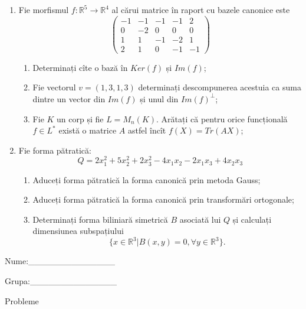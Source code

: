\documentclass{article}
\begin{document}
\begin{enumerate}
 \item Fie morfismul $f:\mathbb{R}^5 \to \mathbb{R}^4$ al cărui matrice în raport cu bazele canonice este
$$\begin{pmatrix}
-1&-1&-1&-1&2\\
0&-2&0&0&0\\
1&1&-1&-2&1\\
2&1&0&-1&-1
\end{pmatrix}$$

\begin{enumerate}
\item Determinați cîte o bază în $Ker(f)$ și $Im(f)$;
\item Fie vectorul $v=(1,3,1,3)$ determinați descompunerea acestuia ca suma dintre un vector din $Im(f)$ și unul din $Im(f)^\perp$;
\item Fie $K$ un corp și fie $L=M_n(K)$. Arătați că pentru orice funcțională $f \in L^*$ există o matrice $A$ astfel încît $f(X)=Tr(AX)$;
\end{enumerate}
\item Fie forma pătratică:
$$Q= 2x_1^2+5x_2^2+2x_3^2-4x_1x_2-2x_1x_3+4x_2x_3$$

\begin{enumerate}
\item Aduceți forma pătratică la forma canonică prin metoda Gauss;
\item Aduceți forma pătratică la forma canonică prin transformări ortogonale;
\item Determinați forma biliniară simetrică $B$ asociată lui $Q$ și calculați dimensiunea subspațiului
$$\{x \in \mathbb{R}^3 | B(x,y)=0,\forall y \in \mathbb{R}^3\}.$$

\end{enumerate}
\end{enumerate}
\newpage
\begin{flushright}
Nume:\_\_\_\_\_\_\_\_\_\_\_\_\_\_
 
 
Grupa:\_\_\_\_\_\_\_\_\_\_\_\_\_\_
\end{flushright}
\begin{center}
\vspace{2cm}
{\Large Probleme}
\vspace{2cm}
\end{center}
\end{document}

